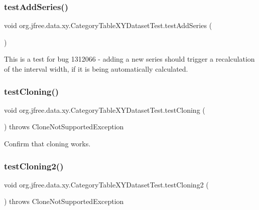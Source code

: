 \subsubsection{\texorpdfstring{test\+Add\+Series()}{testAddSeries()}}
{\footnotesize\ttfamily void org.\+jfree.\+data.\+xy.\+Category\+Table\+X\+Y\+Dataset\+Test.\+test\+Add\+Series (\begin{DoxyParamCaption}{ }\end{DoxyParamCaption})}

This is a test for bug 1312066 -\/ adding a new series should trigger a recalculation of the interval width, if it is being automatically calculated. \mbox{\label{classorg_1_1jfree_1_1data_1_1xy_1_1_category_table_x_y_dataset_test_ad630cc41e4f3eb5fa92eadc2932a1e6d}} 
\subsubsection{\texorpdfstring{test\+Cloning()}{testCloning()}}
{\footnotesize\ttfamily void org.\+jfree.\+data.\+xy.\+Category\+Table\+X\+Y\+Dataset\+Test.\+test\+Cloning (\begin{DoxyParamCaption}{ }\end{DoxyParamCaption}) throws Clone\+Not\+Supported\+Exception}

Confirm that cloning works. \mbox{\label{classorg_1_1jfree_1_1data_1_1xy_1_1_category_table_x_y_dataset_test_afb8442da695ebf41623b15048c346636}} 
\subsubsection{\texorpdfstring{test\+Cloning2()}{testCloning2()}}
{\footnotesize\ttfamily void org.\+jfree.\+data.\+xy.\+Category\+Table\+X\+Y\+Dataset\+Test.\+test\+Cloning2 (\begin{DoxyParamCaption}{ }\end{DoxyParamCaption}) throws Clone\+Not\+Supported\+Exception}


